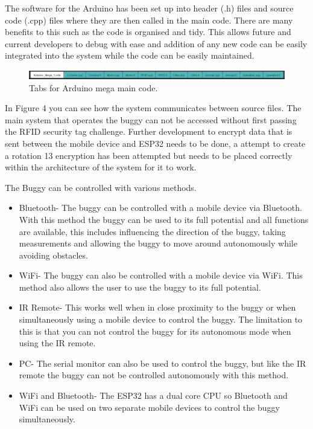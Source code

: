 \documentclass[8pt, a4paper]{article}
\begin{document}
The software for the Arduino has been set up into header (.h) files and source code (.cpp) files where they are then called in the main code. There are many benefits to this such as the code is organised and tidy. This allows future and current developers to debug with ease and addition of any new code can be easily integrated into the system while the code can be easily maintained. 

\begin{figure}[H]
	\includegraphics[width=17cm]{tabs}
	\caption{Tabs for Arduino mega main code.}
\end{figure}

In Figure 4 you can see how the system communicates between source files. The main system that operates the buggy can not be accessed without first passing the RFID security tag challenge. Further development to encrypt data that is sent between the mobile device and ESP32 needs to be done, a attempt to create a rotation 13 encryption has been attempted but needs to be placed correctly within the architecture of the system for it to work. 

The Buggy can be controlled with various methods.
\begin{itemize}
	\item Bluetooth- The buggy can be controlled with a mobile device via Bluetooth. With this method the buggy can be used to its full potential and all functions are available, this includes influencing the direction of the buggy, taking measurements and allowing the buggy to move around autonomously while avoiding obstacles. 
	\item WiFi- The buggy can also be controlled with a mobile device via WiFi. This method also allows the user to use the buggy to its full potential. 
	\item IR Remote- This works well when in close proximity to the buggy or when simultaneously using a mobile device to control the buggy. The limitation to this is that you can not control the buggy for its autonomous mode when using the IR remote.
	\item PC- The serial monitor can also be used to control the buggy, but like the IR remote the buggy can not be controlled autonomously with this method. 
	\item WiFi and Bluetooth- The ESP32 has a dual core CPU so Bluetooth and WiFi can be used on two separate mobile devices to control the buggy simultaneously.  
\end{itemize}	
\end{document}
